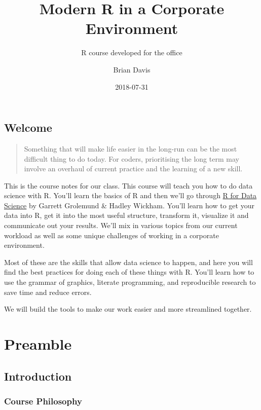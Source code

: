 \documentclass[]{book}
\title{Modern R in a Corporate Environment}
\subtitle{R course developed for the office}
\author{Brian Davis}
\date{2018-07-31}
\theoremstyle{definition}
\theoremstyle{definition}
\theoremstyle{definition}
\theoremstyle{remark}
\begin{document}
\maketitle

{
\setcounter{tocdepth}{1}
\tableofcontents
}
\chapter*{Welcome}\label{welcome}

\begin{quote}
Something that will make life easier in the long-run can be the most
difficult thing to do today. For coders, prioritising the long term may
involve an overhaul of current practice and the learning of a new skill.
\end{quote}

This is the course notes for our class. This course will teach you how
to do data science with R. You'll learn the basics of R and then we'll
go through \href{http://r4ds.had.co.nz/index.html}{R for Data Science}
by Garrett Grolemund \& Hadley Wickham. You'll learn how to get your
data into R, get it into the most useful structure, transform it,
visualize it and communicate out your results. We'll mix in various
topics from our current workload as well as some unique challenges of
working in a corporate environment.

Most of these are the skills that allow data science to happen, and here
you will find the best practices for doing each of these things with R.
You'll learn how to use the grammar of graphics, literate programming,
and reproducible research to save time and reduce errors.

We will build the tools to make our work easier and more streamlined
together.

\part{Preamble}\label{part-preamble}

\chapter{Introduction}\label{preamble-intro}

\section{Course Philosophy}\label{course-philosophy}
\end{document}
